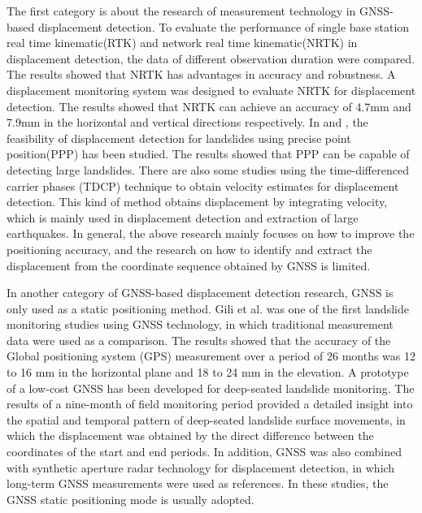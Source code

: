 \documentclass[final,3p,times]{elsarticle}
\begin{document}
	The first category is about the research of measurement technology in GNSS-based displacement detection.
	To evaluate the performance of single base station real time kinematic(RTK) and network real time kinematic(NRTK) in displacement detection, the data of different observation duration were compared\cite{wang2011gps}. The results showed that NRTK has advantages in accuracy and robustness.
	A displacement monitoring system was designed to evaluate NRTK for displacement detection\cite{GUMUS2019131}. The results showed that NRTK can achieve an accuracy of 4.7mm and 7.9mm in the horizontal and vertical directions respectively.
	In \cite{csanliouglu2016landslide} and \cite{lytvyn2012real}, the feasibility of displacement detection for landslides  using precise point position(PPP) has been studied. The results showed that PPP can be capable of detecting large landslides.
	There are also some studies using the time-differenced carrier phases (TDCP) technique\cite{freda2015time,colosimo2011real} to obtain velocity estimates for displacement detection. This kind of method obtains displacement by integrating velocity, which is mainly used in displacement detection and extraction of large earthquakes.
	In general, the above research mainly focuses on how to improve the positioning accuracy, and the research on how to identify and extract the displacement from the coordinate sequence obtained by GNSS is limited.
	
	In another category of GNSS-based displacement detection research, GNSS is only used as a static positioning method.
	Gili et al.\cite{gili2000using} was one of the first landslide monitoring studies using GNSS technology, in which traditional measurement data were used as a comparison. 
	The results showed that the accuracy of the Global positioning system (GPS) measurement over a period of 26 months was 12 to 16 mm in the horizontal plane and 18 to 24 mm in the elevation.
	A prototype of a low-cost GNSS has been developed for deep-seated landslide monitoring\cite{rs12203375}. 
	The results of a nine-month of field monitoring period provided a detailed insight into the spatial and temporal pattern of deep-seated landslide surface movements, in which the displacement was obtained by the direct difference between the coordinates of the start and end periods.
	In addition, GNSS was also combined with synthetic aperture radar technology for displacement detection, in which long-term GNSS measurements were used as references\cite{atanasova2018ground,fuhrmann2015estimation}.
	In these studies, the GNSS static positioning mode is usually adopted.
	
\end{document}

